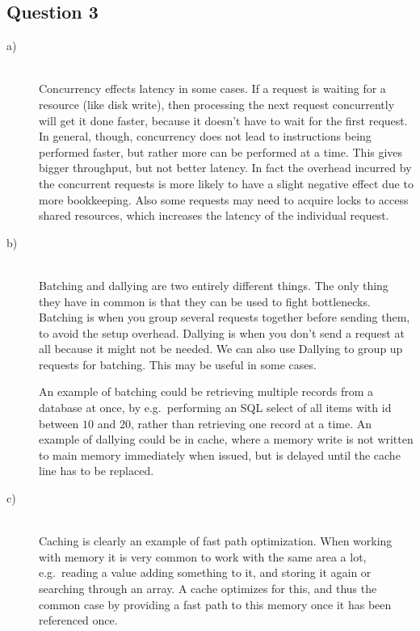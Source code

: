 \documentclass[a4paper,final]{article}
\begin{document}
\subsection*{Question 3}
\begin{description}
\item [a)]\ \\
Concurrency effects latency in some cases. If a request is waiting for a
resource (like disk write), then processing the next request concurrently
will get it done faster, because it doesn't have to wait for the first
request. In general, though, concurrency does not lead to instructions
being performed faster, but rather more can be performed at a time.
This gives bigger throughput, but not better latency. In
fact the overhead incurred by the concurrent requests is more likely to have
a slight negative effect due to more bookkeeping. Also some requests may need
to acquire locks to access shared resources, which increases the latency of
the individual request.

\item [b)]\ \\
Batching and dallying are two entirely different things. The only thing they
have in common is that they can be used to fight bottlenecks. Batching is when
you group several requests together before sending them, to avoid the setup
overhead. Dallying is when you don't send a request at all because it might
not be needed. We can also use Dallying to group up requests for batching.
This may be useful in some cases.

An example of batching could be retrieving multiple records from a database
at once, by e.g.\ performing an SQL select of all items with id between $10$ and
$20$, rather than retrieving one record at a time.
An example of dallying could be in cache, where a memory write is not written
to main memory immediately when issued, but is delayed until the cache line
has to be replaced.
\item [c)]\ \\
Caching is clearly an example of fast path optimization. When working with
memory it is very common to work with the same area a lot, e.g.\ reading a value
adding something to it, and storing it again or searching through an array.
A cache optimizes for this, and thus the common case by providing a fast path
to this memory once it has been referenced once.
\end{description}
\end{document}
